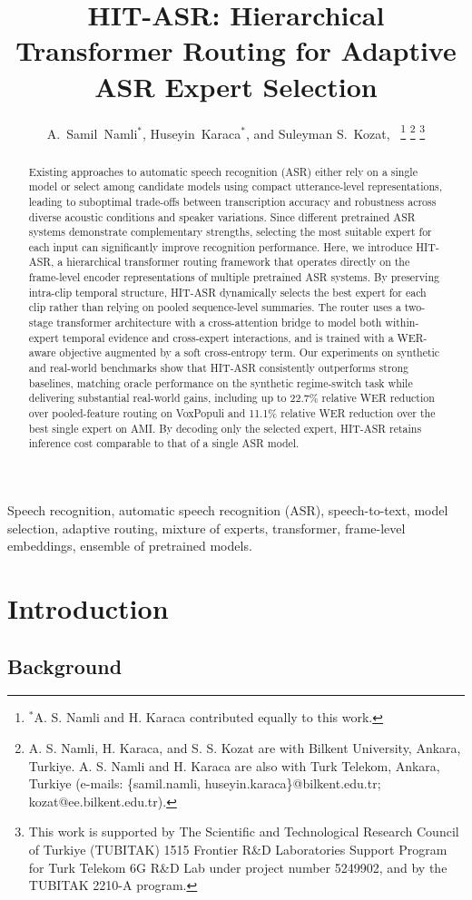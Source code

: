 \documentclass[journal]{IEEEtran}
\title{HIT-ASR: Hierarchical Transformer Routing for Adaptive ASR Expert Selection}
\author{A.~Samil~Namli$^{*}$, 
        Huseyin~Karaca$^{*}$,
        and Suleyman S.~Kozat,~\IEEEmembership{Senior~Member,~IEEE}
\thanks{$^{*}$A. S. Namli and H. Karaca contributed equally to this work.}
\thanks{A. S. Namli, H. Karaca, and S. S. Kozat are with Bilkent University, Ankara, Turkiye. A. S. Namli and H. Karaca are also with Turk Telekom, Ankara, Turkiye (e-mails: \{samil.namli, huseyin.karaca\}@bilkent.edu.tr; kozat@ee.bilkent.edu.tr).}%
\thanks{This work is supported by The Scientific and Technological Research Council of Turkiye (TUBITAK) 1515 Frontier R\&D Laboratories Support Program for Turk Telekom 6G R\&D Lab under project number 5249902, and by the TUBITAK 2210-A program.}%
}
\date{}
\begin{document}
\maketitle 

\begin{abstract}
Existing approaches to automatic speech recognition (ASR) either rely on a single model or select among candidate models using compact utterance-level representations, leading to suboptimal trade-offs between transcription accuracy and robustness across diverse acoustic conditions and speaker variations. Since different pretrained ASR systems demonstrate complementary strengths, selecting the most suitable expert for each input can significantly improve recognition performance. Here, we introduce HIT-ASR, a hierarchical transformer routing framework that operates directly on the frame-level encoder representations of multiple pretrained ASR systems. By preserving intra-clip temporal structure, HIT-ASR dynamically selects the best expert for each clip rather than relying on pooled sequence-level summaries. The router uses a two-stage transformer architecture with a cross-attention bridge to model both within-expert temporal evidence and cross-expert interactions, and is trained with a WER-aware objective augmented by a soft cross-entropy term. Our experiments on synthetic and real-world benchmarks show that HIT-ASR consistently outperforms strong baselines, matching oracle performance on the synthetic regime-switch task while delivering substantial real-world gains, including up to 22.7\% relative WER reduction over pooled-feature routing on VoxPopuli and 11.1\% relative WER reduction over the best single expert on AMI. By decoding only the selected expert, HIT-ASR retains inference cost comparable to that of a single ASR model.
\end{abstract}

\begin{IEEEkeywords}
Speech recognition, automatic speech recognition (ASR),
speech-to-text, model selection, adaptive routing, mixture of
experts, transformer, frame-level embeddings, ensemble of pretrained
models.
\end{IEEEkeywords}


\section{Introduction}
\label{sec:introduction}

\subsection{Background}
\end{document}
